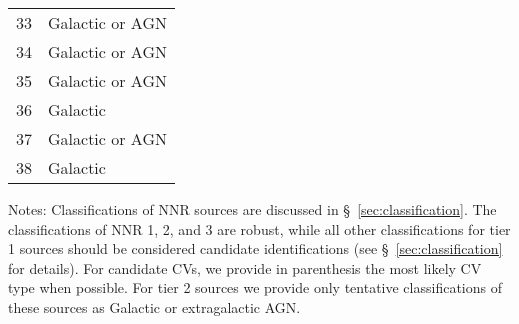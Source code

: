 \documentclass[iop,revtex4]{emulateapj}
\newcommand\T{\rule{0pt}{2.6ex}}       %
\newcommand\B{\rule[-1.2ex]{0pt}{0pt}} %
\begin{document}
\begin{table}
\begin{minipage}{\linewidth}
\begin{adjustwidth}{-0.9in}{-0.9in}
\begin{threeparttable}
\begin{tabular}{cl}
33 & Galactic or AGN \\
34 & Galactic or AGN \\
35 & Galactic or AGN \\
36 & Galactic \\
37 & Galactic or AGN \\
\B 38 & Galactic \\
\hline \hline
\end{tabular}
\begin{tablenotes}[flushleft]
\item \T Notes: Classifications of NNR sources are discussed in \S~\ref{sec:classification}.  The classifications of NNR 1, 2, and 3 are robust, while all other classifications for tier 1 sources should be considered candidate identifications (see \S~\ref{sec:classification} for details).  For candidate CVs, we provide in parenthesis the most likely CV type when possible.  For tier 2 sources we provide only tentative classifications of these sources as Galactic or extragalactic AGN.
\end{tablenotes}
\label{tab:class}
\end{threeparttable}
\end{adjustwidth}
\end{minipage}
\end{table}
\end{document}
